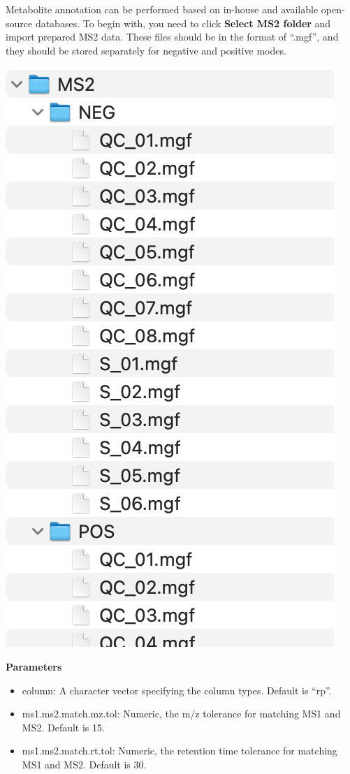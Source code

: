 \documentclass[
]{book}
\providecommand{\tightlist}{%
  \setlength{\itemsep}{0pt}\setlength{\parskip}{0pt}}
\begin{document}
Metabolite annotation can be performed based on in-house and available open-source databases. To begin with, you need to click \textbf{Select MS2 folder} and import prepared MS2 data. These files should be in the format of ``.mgf'', and they should be stored separately for negative and positive modes.

\includegraphics{figures/ms2_folder.png}

\textbf{Parameters}

\begin{itemize}
\tightlist
\item
  column: A character vector specifying the column types. Default is ``rp''.
\item
  ms1.ms2.match.mz.tol: Numeric, the m/z tolerance for matching MS1 and MS2. Default is 15.
\item
  ms1.ms2.match.rt.tol: Numeric, the retention time tolerance for matching MS1 and MS2. Default is 30.
\end{itemize}
\end{document}
